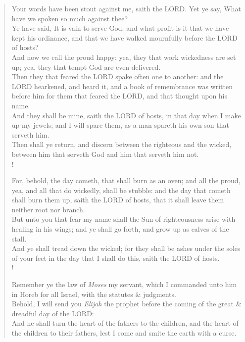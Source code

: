 \documentclass[MAIN]{subfiles}
\begin{document}
\begin{verse}
Your words have been stout against me, saith the {\hge LORD}. Yet ye say, What have we spoken so much against thee?\\
Ye have said, It is vain to serve God: and what profit is it that we have kept his ordinance, and that we have walked mournfully before the {\hge LORD} of hosts?\\
And now we call the proud happy; yea, they that work wickedness are set up; yea, they that tempt God are even delivered.\\
Then they that feared the {\hge LORD} spake often one to another: and the {\hge LORD} hearkened, and heard it, and a book of remembrance was written before him for them that feared the {\hge LORD}, and that thought upon his name.\\
And they shall be mine, saith the {\hge LORD} of hosts, in that day when I make up my jewels; and I will spare them, as a man spareth his own son that serveth him.\\
Then shall ye return, and discern between the righteous and the wicked, between him that serveth God and him that serveth him not.\\!

For, behold, the day cometh, that shall burn as an oven; and all the proud, yea, and all that do wickedly, shall be stubble: and the day that cometh shall burn them up, saith the {\hge LORD} of hosts, that it shall leave them neither root nor branch.\\
But unto you that fear my name shall the Sun of righteousness arise with healing in his wings; and ye shall go forth, and grow up as calves of the stall.\\
And ye shall tread down the wicked; for they shall be ashes under the soles of your feet in the day that I shall do this, saith the {\hge LORD} of hosts.\\!

Remember ye the law of \emph{Moses} my servant, which I commanded unto him in {\sc Horeb} for all Israel, with the statutes \&
judgments.\\
Behold, I will send you \emph{Elijah} the prophet before the coming of the great \& dreadful day of the {\hge LORD}:\\
And he shall turn the heart of the fathers to the children, and the heart of the children to their fathers, lest I come and smite the earth with a curse.
\end{verse}
\end{document}
